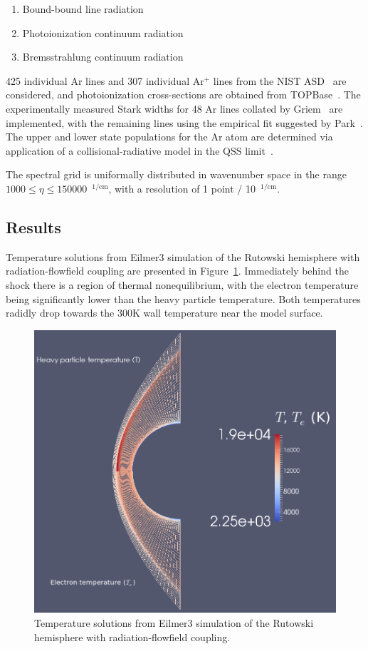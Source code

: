 \begin{enumerate}
 \item Bound-bound line radiation
 \item Photoionization continuum radiation
 \item Bremsstrahlung continuum radiation
\end{enumerate}

425 individual Ar lines and 307 individual Ar$^+$ lines from the NIST ASD~\cite{NIST_ASD} are considered, and  photoionization cross-sections are obtained from TOPBase~\cite{TOPbase}.
The experimentally measured Stark widths for 48 Ar lines collated by Griem~\cite{Griem74} are implemented, with the remaining lines using the empirical fit suggested by Park~\cite{Park82}.
The upper and lower state populations for the Ar atom are determined via application of a collisional-radiative model in the QSS limit~\cite{park_1990}.

\par

The spectral grid is uniformally distributed in wavenumber space in the range $1000 \leq \eta \leq 150000$~$^{1/\text{cm}}$, with a resolution of 1 point / 10~$^{1/\text{cm}}$.

\subsection{Results}

Temperature solutions from Eilmer3 simulation of the Rutowski hemisphere with radiation-flowfield coupling are presented in Figure~\ref{fig:rutowskiTemperature}.
Immediately behind the shock there is a region of thermal nonequilibrium, with the electron temperature being significantly lower than the heavy particle temperature.
Both temperatures radidly drop towards the 300K wall temperature near the model surface.

\begin{figure}
 \centering
 \includegraphics[width=0.7\linewidth]{../2D/Rutowski-hemisphere/figures/temperature.png}
 \caption{Temperature solutions from Eilmer3 simulation of the Rutowski hemisphere with radiation-flowfield coupling.}
 \label{fig:rutowskiTemperature}
\end{figure}

